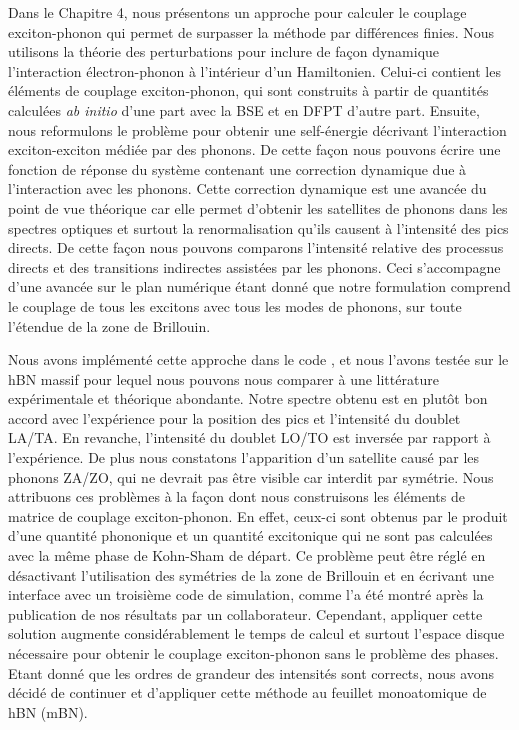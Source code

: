 %
%
Dans le Chapitre 4, nous présentons un approche pour calculer le couplage exciton-phonon qui permet de surpasser la méthode par différences finies. Nous utilisons la théorie des perturbations pour inclure de façon dynamique l'interaction électron-phonon à l'intérieur d'un Hamiltonien. Celui-ci contient les éléments de couplage exciton-phonon, qui sont construits à partir de quantités calculées \textit{ab initio} d'une part avec la BSE et en DFPT d'autre part. Ensuite, nous reformulons le problème pour obtenir une self-énergie décrivant l'interaction exciton-exciton médiée par des phonons. De cette façon nous pouvons écrire une fonction de réponse du système contenant une correction dynamique due à l'interaction avec les phonons. Cette correction dynamique est une avancée du point de vue théorique car elle permet d'obtenir les satellites de phonons dans les spectres optiques et surtout la renormalisation qu'ils causent à l'intensité des pics directs. De cette façon nous pouvons comparons l'intensité relative des processus directs et des transitions indirectes assistées par les phonons. Ceci s'accompagne d'une avancée sur le plan numérique étant donné que notre formulation comprend le couplage de tous les excitons avec tous les modes de phonons, sur toute l'étendue de la zone de Brillouin. 

Nous avons implémenté cette approche dans le code \yambo, et nous l'avons testée sur le hBN massif pour lequel nous pouvons nous comparer à une littérature expérimentale et théorique abondante. Notre spectre obtenu est en plutôt bon accord avec l'expérience pour la position des pics et l'intensité du doublet LA/TA. En revanche, l'intensité du doublet LO/TO est inversée par rapport à l'expérience. De plus nous constatons l'apparition d'un satellite causé par les phonons ZA/ZO, qui ne devrait pas être visible car interdit par symétrie. Nous attribuons ces problèmes à la façon dont nous construisons les éléments de matrice de couplage exciton-phonon. En effet, ceux-ci sont obtenus par le produit d'une quantité phononique et un quantité excitonique qui ne sont pas calculées avec la même phase de Kohn-Sham de départ. Ce problème peut être réglé en désactivant l'utilisation des symétries de la zone de Brillouin et en écrivant une interface avec un troisième code de simulation, comme l'a été montré après la publication de nos résultats par un collaborateur. Cependant, appliquer cette solution augmente considérablement le temps de calcul et surtout l'espace disque nécessaire pour obtenir le couplage exciton-phonon sans le problème des phases. Etant donné que les ordres de grandeur des intensités sont corrects, nous avons décidé de continuer et d'appliquer cette méthode au feuillet monoatomique de hBN (mBN).

